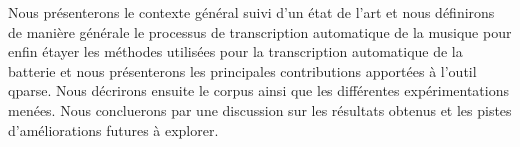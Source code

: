 Nous présenterons le contexte général suivi d’un état de l’art et nous définirons de manière générale le processus de transcription automatique de la musique pour enfin étayer les méthodes utilisées pour la transcription automatique de la batterie et nous présenterons les principales contributions apportées à l’outil qparse. Nous décrirons ensuite le corpus ainsi que les différentes expérimentations menées. Nous concluerons par une discussion sur les résultats obtenus et les pistes d’améliorations futures à explorer.